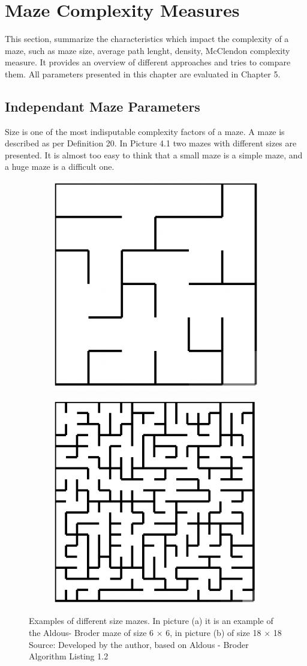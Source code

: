 \section{Maze Complexity Measures}
This section, summarize the characteristics which impact the complexity of a maze, such as maze size, average path lenght, density, McClendon complexity measure. It provides an overview of different approaches and tries to compare them. All parameters presented in this chapter are evaluated in Chapter 5.
\subsection{Independant Maze Parameters}
Size is one of the most indisputable complexity factors of a maze. A maze is described as per Definition 20.\textcolor{}{ In Picture 4.1 two mazes with different sizes are presented.} It is almost too easy to think that a small maze is a simple maze, and a huge maze is a difficult one.
\begin{figure}[!h]
    \centering
    \begin{subfigure}{.5\textwidth}
    \centering
    \includegraphics[width=.5\linewidth]{66}
    \caption{}
\label{fig:sub1}
    \end{subfigure}%
    \begin{subfigure}{.5\textwidth}
    \centering
    \includegraphics[width=.5\linewidth]{1818}
    \caption{}
\label{fig:sub2}
    \end{subfigure}
    \caption{Examples of different size mazes. In picture (a) it is an example of the Aldous- Broder maze of size 6 $\times$ 6, in picture (b) of size 18 $\times$ 18 \\ Source: Developed by the author,  based on Aldous - Broder Algorithm Listing 1.2 }
\label{fig:test}
\end{figure}
